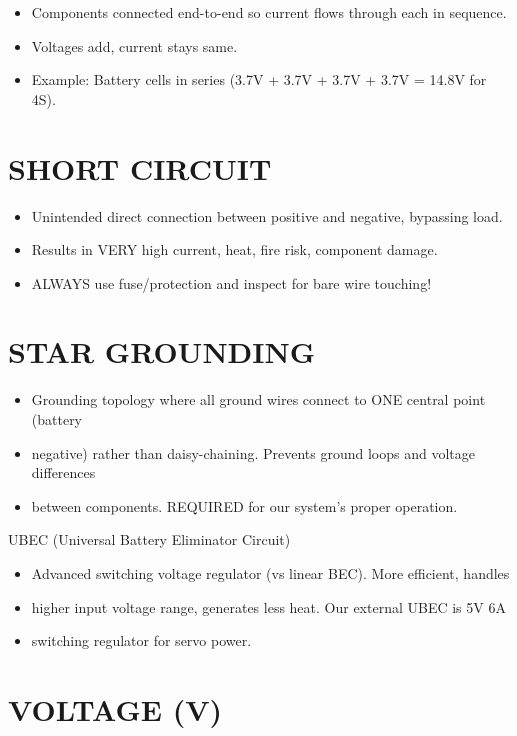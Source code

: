 \documentclass[11pt,letterpaper]{article}
\begin{document}
\begin{itemize}
  \item Components connected end-to-end so current flows through each in sequence.
  \item Voltages add, current stays same.
  \item Example: Battery cells in series (3.7V + 3.7V + 3.7V + 3.7V = 14.8V for 4S).
\end{itemize}

\section{SHORT CIRCUIT}

\begin{itemize}
  \item Unintended direct connection between positive and negative, bypassing load.
  \item Results in VERY high current, heat, fire risk, component damage.
  \item [WARNING] ALWAYS use fuse/protection and inspect for bare wire touching!
\end{itemize}

\section{STAR GROUNDING}

\begin{itemize}
  \item Grounding topology where all ground wires connect to ONE central point (battery
  \item negative) rather than daisy-chaining. Prevents ground loops and voltage differences
  \item between components. REQUIRED for our system's proper operation.
\end{itemize}

UBEC (Universal Battery Eliminator Circuit)\par

\begin{itemize}
  \item Advanced switching voltage regulator (vs linear BEC). More efficient, handles
  \item higher input voltage range, generates less heat. Our external UBEC is 5V 6A
  \item switching regulator for servo power.
\end{itemize}

\section{VOLTAGE (V)}
\end{document}
